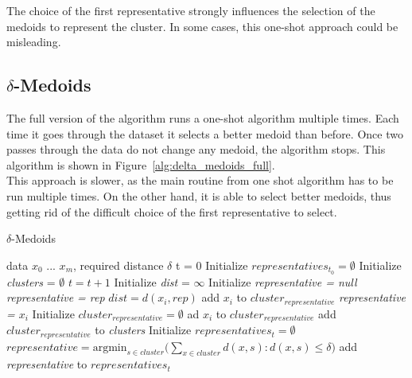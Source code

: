 \documentclass[thesis=B,english]{FITthesis}[2012/10/20]
\begin{document}
The choice of the first representative strongly influences the selection of the medoids to represent the cluster.
In some cases, this one-shot approach could be misleading.

\subsection{$\delta$-Medoids}

The full version of the algorithm runs a one-shot algorithm multiple times.
Each time it goes through the dataset it selects a better medoid than before.
Once two passes through the data do not change any medoid, the algorithm stops.
This algorithm is shown in Figure~\ref{alg:delta_medoids_full}.\\

This approach is slower, as the main routine from one shot algorithm has to be run multiple times.
On the other hand, it is able to select better medoids, thus getting rid of the difficult choice of the first representative to select.

\begin{algorithm}\label{alg:delta_medoids_full}
    \caption{$\delta$-Medoids}
    \label{delta_medoids_full}
    \begin{algorithmic}[1]
        \INPUT data $x_0$ ... $x_m$, required distance $\delta$
        \STATE t = 0
        \STATE Initialize $representatives_{t_0} = \emptyset$
        \STATE Initialize \textit{clusters} = $\emptyset$
        \DO
            \STATE $t = t + 1$
                \STATE Initialize \textit{dist} = $\infty$
                \STATE Initialize \textit{representative = null}
                        \STATE \textit{representative = rep}
                        \STATE $dist = d(x_i, rep)$
                    \ENDIF
                \ENDFOR
                    \STATE add $x_i$ to $cluster_{representative}$
                \ELSE
                    \STATE \textit{representative = $x_i$}
                    \STATE Initialize $cluster_{representative} = \emptyset$
                    \STATE ad $x_i$ to $cluster_{representative}$
                    \STATE add $cluster_{representative}$ to \textit{clusters}
                \ENDIF
            \ENDFOR
            \STATE Initialize $representatives_t = \emptyset$
                \STATE $representative = \textrm{argmin}_{s \in cluster} (\sum\limits_{x \in cluster}{d(x,s) : d(x,s) \le \delta)}$
                \STATE add \textit{representative} to $representatives_t$
            \ENDFOR
    \end{algorithmic}
\end{algorithm}
\end{document}
